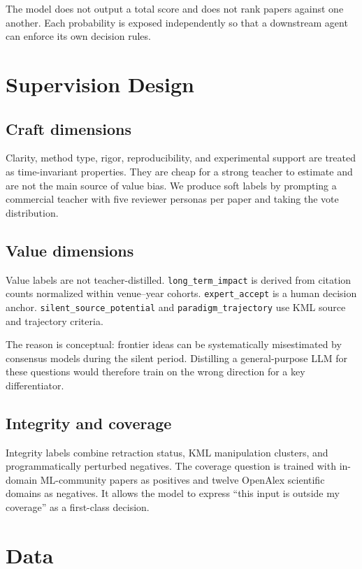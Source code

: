 \documentclass[11pt]{article}
\begin{document}
The model does not output a total score and does not rank papers against one
another. Each probability is exposed independently so that a downstream agent
can enforce its own decision rules.

\section{Supervision Design}

\subsection{Craft dimensions}

Clarity, method type, rigor, reproducibility, and experimental support are
treated as time-invariant properties. They are cheap for a strong teacher to
estimate and are not the main source of value bias. We produce soft labels by
prompting a commercial teacher with five reviewer personas per paper and taking
the vote distribution.

\subsection{Value dimensions}

Value labels are not teacher-distilled. \texttt{long\_term\_impact} is derived
from citation counts normalized within venue--year cohorts.
\texttt{expert\_accept} is a human decision anchor.
\texttt{silent\_source\_potential} and \texttt{paradigm\_trajectory} use KML
source and trajectory criteria.

The reason is conceptual: frontier ideas can be systematically misestimated by
consensus models during the silent period. Distilling a general-purpose LLM for
these questions would therefore train on the wrong direction for a key
differentiator.

\subsection{Integrity and coverage}

Integrity labels combine retraction status, KML manipulation clusters, and
programmatically perturbed negatives. The coverage question is trained with
in-domain ML-community papers as positives and twelve OpenAlex scientific
domains as negatives. It allows the model to express ``this input is outside my
coverage'' as a first-class decision.

\section{Data}
\end{document}
